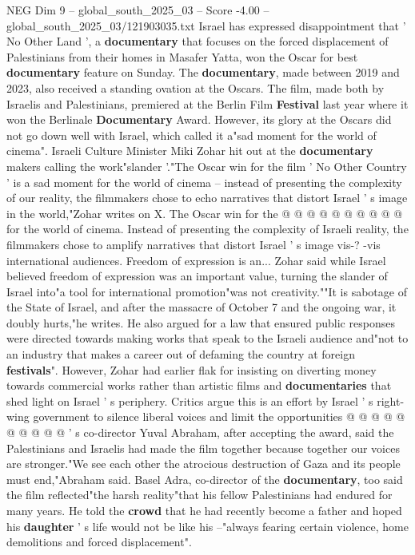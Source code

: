 \begin{textsample}{NEG Dim 9 – global\_south\_2025\_03 – Score -4.00 – global\_south\_2025\_03/121903035.txt}  \label{ex:f9_neg_395}
Israel has expressed disappointment that ' No Other Land ', a \textbf{documentary} that focuses on the forced displacement of Palestinians from their homes in Masafer Yatta, won the Oscar for best \textbf{documentary} feature on Sunday.
The \textbf{documentary}, made between 2019 and 2023, also received a standing ovation at the Oscars.
The film, made both by Israelis and Palestinians, premiered at the Berlin Film \textbf{Festival} last year where it won the Berlinale \textbf{Documentary} Award.
However, its glory at the Oscars did not go down well with Israel, which called it a"sad moment for the world of cinema".
Israeli Culture Minister Miki Zohar hit out at the \textbf{documentary} makers calling the work"slander '."The Oscar win for the film ' No Other Country ' is a sad moment for the world of cinema -- instead of presenting the complexity of our reality, the filmmakers chose to echo narratives that distort Israel ' s image in the world,"Zohar writes on X.
The Oscar win for the @ @ @ @ @ @ @ @ @ @ for the world of cinema.
Instead of presenting the complexity of Israeli reality, the filmmakers chose to amplify narratives that distort Israel ' s image vis-? -vis international audiences.
Freedom of expression is an...
Zohar said while Israel believed freedom of expression was an important value, turning the slander of Israel into"a tool for international promotion"was not creativity.""It is sabotage of the State of Israel, and after the massacre of October 7 and the ongoing war, it doubly hurts,"he writes.
He also argued for a law that ensured public responses were directed towards making works that speak to the Israeli audience and"not to an industry that makes a career out of defaming the country at foreign \textbf{festivals}".
However, Zohar had earlier flak for insisting on diverting money towards commercial works rather than artistic films and \textbf{documentaries} that shed light on Israel ' s periphery.
Critics argue this is an effort by Israel ' s right-wing government to silence liberal voices and limit the opportunities @ @ @ @ @ @ @ @ @ @ ' s co-director Yuval Abraham, after accepting the award, said the Palestinians and Israelis had made the film together because together our voices are stronger."We see each other the atrocious destruction of Gaza and its people must end,"Abraham said.
Basel Adra, co-director of the \textbf{documentary}, too said the film reflected"the harsh reality"that his fellow Palestinians had endured for many years.
He told the \textbf{crowd} that he had recently become a father and hoped his \textbf{daughter} ' s life would not be like his --"always fearing certain violence, home demolitions and forced displacement".

\end{textsample}
